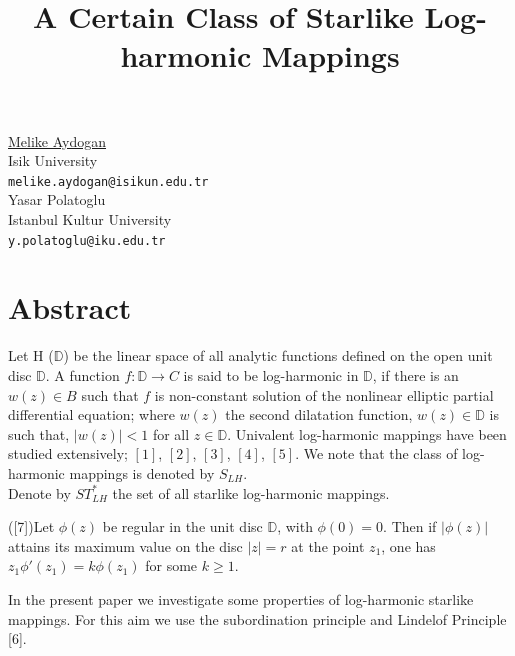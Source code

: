 \documentclass[article,A4,11pt]{llncs}%
\begin{document}
\title{A Certain Class of Starlike Log-harmonic Mappings}
 \author{} \institute{}
\maketitle
\begin{center}
{\large \underline{Melike Aydogan}}\\
Isik University\\
{\tt melike.aydogan@isikun.edu.tr}
\\ \vspace{4mm}
{\large Yasar Polatoglu}\\
Istanbul Kultur University\\
{\tt y.polatoglu@iku.edu.tr}
\end{center}

\section*{Abstract}
\newcommand{\de}{\mathbb{D}}
Let H ($\de$) be the linear space of all analytic functions defined on the open unit  disc $\de$. 
A function $f: \de \rightarrow C$ is said to be log-harmonic in $\de$, if there is an $w(z)\in B$ such that $f$ is non-constant solution of the nonlinear elliptic partial differential equation; where $w(z)$ the second dilatation function, $w(z)\in \de$ is such that, $\left|w(z)\right|<1$ for all $z\in \de$. Univalent log-harmonic mappings have been studied extensively;  $[1]$, $[2]$, $[3]$, $[4]$, $[5]$. We note that the class of log-harmonic mappings is denoted by $S_{LH}$.\\
Denote by $ST^*_{LH}$ the set of all starlike log-harmonic mappings.
\begin{lemma}([7])Let $\phi(z)$ be regular in the unit disc $\de$, with $\phi(0)=0$. Then if $\left|\phi(z)\right|$ attains its maximum value on the disc $\left|z\right|=r$ at the point $z_{1}$, one has $z_{1}\phi'(z_{1})=k\phi(z_{1})$ for some $k\geq 1$.
\end{lemma}
In the present paper we investigate some properties of log-harmonic starlike mappings. For this aim we use the subordination principle and Lindelof Principle [6].
\end{document}
